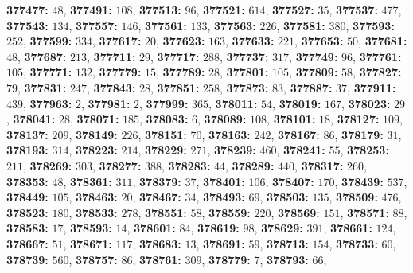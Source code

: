 \textsf{\bfseries 377477:} $48$, \textsf{\bfseries 377491:} $108$, \textsf{\bfseries 377513:} $96$, \textsf{\bfseries 377521:} $614$, \textsf{\bfseries 377527:} $35$, \textsf{\bfseries 377537:} $477$, \textsf{\bfseries 377543:} $134$, \textsf{\bfseries 377557:} $146$, \textsf{\bfseries 377561:} $133$, \textsf{\bfseries 377563:} $226$, \textsf{\bfseries 377581:} $380$, \textsf{\bfseries 377593:} $252$, \textsf{\bfseries 377599:} $334$, \textsf{\bfseries 377617:} $20$, \textsf{\bfseries 377623:} $163$, \textsf{\bfseries 377633:} $221$, \textsf{\bfseries 377653:} $50$, \textsf{\bfseries 377681:} $48$, \textsf{\bfseries 377687:} $213$, \textsf{\bfseries 377711:} $29$, \textsf{\bfseries 377717:} $288$, \textsf{\bfseries 377737:} $317$, \textsf{\bfseries 377749:} $96$, \textsf{\bfseries 377761:} $105$, \textsf{\bfseries 377771:} $132$, \textsf{\bfseries 377779:} $15$, \textsf{\bfseries 377789:} $28$, \textsf{\bfseries 377801:} $105$, \textsf{\bfseries 377809:} $58$, \textsf{\bfseries 377827:} $79$, \textsf{\bfseries 377831:} $247$, \textsf{\bfseries 377843:} $28$, \textsf{\bfseries 377851:} $258$, \textsf{\bfseries 377873:} $83$, \textsf{\bfseries 377887:} $37$, \textsf{\bfseries 377911:} $439$, \textsf{\bfseries 377963:} $2$, \textsf{\bfseries 377981:} $2$, \textsf{\bfseries 377999:} $365$, \textsf{\bfseries 378011:} $54$, \textsf{\bfseries 378019:} $167$, \textsf{\bfseries 378023:} $29$, \textsf{\bfseries 378041:} $28$, \textsf{\bfseries 378071:} $185$, \textsf{\bfseries 378083:} $6$, \textsf{\bfseries 378089:} $108$, \textsf{\bfseries 378101:} $18$, \textsf{\bfseries 378127:} $109$, \textsf{\bfseries 378137:} $209$, \textsf{\bfseries 378149:} $226$, \textsf{\bfseries 378151:} $70$, \textsf{\bfseries 378163:} $242$, \textsf{\bfseries 378167:} $86$, \textsf{\bfseries 378179:} $31$, \textsf{\bfseries 378193:} $314$, \textsf{\bfseries 378223:} $214$, \textsf{\bfseries 378229:} $271$, \textsf{\bfseries 378239:} $460$, \textsf{\bfseries 378241:} $55$, \textsf{\bfseries 378253:} $211$, \textsf{\bfseries 378269:} $303$, \textsf{\bfseries 378277:} $388$, \textsf{\bfseries 378283:} $44$, \textsf{\bfseries 378289:} $440$, \textsf{\bfseries 378317:} $260$, \textsf{\bfseries 378353:} $48$, \textsf{\bfseries 378361:} $311$, \textsf{\bfseries 378379:} $37$, \textsf{\bfseries 378401:} $106$, \textsf{\bfseries 378407:} $170$, \textsf{\bfseries 378439:} $537$, \textsf{\bfseries 378449:} $105$, \textsf{\bfseries 378463:} $20$, \textsf{\bfseries 378467:} $34$, \textsf{\bfseries 378493:} $69$, \textsf{\bfseries 378503:} $135$, \textsf{\bfseries 378509:} $476$, \textsf{\bfseries 378523:} $180$, \textsf{\bfseries 378533:} $278$, \textsf{\bfseries 378551:} $58$, \textsf{\bfseries 378559:} $220$, \textsf{\bfseries 378569:} $151$, \textsf{\bfseries 378571:} $88$, \textsf{\bfseries 378583:} $17$, \textsf{\bfseries 378593:} $14$, \textsf{\bfseries 378601:} $84$, \textsf{\bfseries 378619:} $98$, \textsf{\bfseries 378629:} $391$, \textsf{\bfseries 378661:} $124$, \textsf{\bfseries 378667:} $51$, \textsf{\bfseries 378671:} $117$, \textsf{\bfseries 378683:} $13$, \textsf{\bfseries 378691:} $59$, \textsf{\bfseries 378713:} $154$, \textsf{\bfseries 378733:} $60$, \textsf{\bfseries 378739:} $560$, \textsf{\bfseries 378757:} $86$, \textsf{\bfseries 378761:} $309$, \textsf{\bfseries 378779:} $7$, \textsf{\bfseries 378793:} $66$, 
